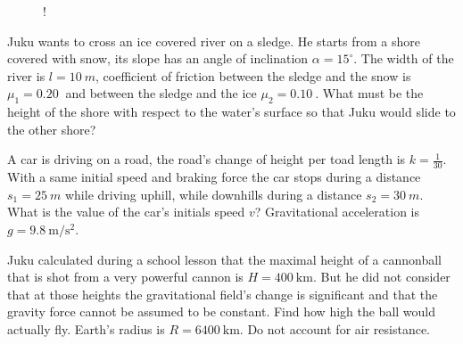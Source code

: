 \documentclass[11pt]{article}
\begin{document}

\probeng
\begin{figure}
	\vspace{-12pt}
	\begin{resizebox}{\linewidth}{!}{
	}
	\end{resizebox}
\end{figure}
Juku wants to cross an ice covered river on a sledge. He starts from a shore covered with snow, its slope has an angle of inclination $\alpha = 15^{\circ}$. The width of the river is $l = \SI{10}{m}$, coefficient of friction between the sledge and the snow is $\mu_1 = \SI{0.20}{}$ and between the sledge and the ice $\mu_2 = \SI{0.10}{}$. What must be the height of the shore with respect to the water’s surface so that Juku would slide to the other shore?
\probend
\bigskip


\probeng
A car is driving on a road, the road’s change of height per toad length is $k=\frac{1}{30}$. With a same initial speed and braking force the car stops during a distance $s_1=\SI{25}{m}$ while driving uphill, while downhills during a distance $s_2=\SI{30}{m}$. What is the value of the car’s initials speed $v$? Gravitational acceleration is $g=\SI{9.8}{\meter\per\second\squared}$.
\probend
\bigskip


\probeng
Juku calculated during a school lesson that the maximal height of a cannonball that is shot from a very powerful cannon is $H=\SI{400}{\km}$. But he did not consider that at those heights the gravitational field’s change is significant and that the gravity force cannot be assumed to be constant. Find how high the ball would actually fly. Earth’s radius is $R=\SI{6400}{\km}$. Do not account for air resistance.
\probend
\bigskip
\end{document}
